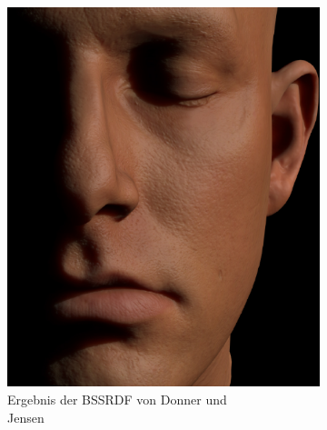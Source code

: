 \documentclass[ngerman,runningheads,a4paper]{llncs}[2018/03/10]
\begin{document}
\begin{figure}
  \centering
  \begin{subfigure}{.5\textwidth}
    \centering
    \includegraphics[scale=0.35,keepaspectratio]{./images/jensen-final-result.png}
    \caption{Ergebnis der BSSRDF von Donner und \\\hspace{\textwidth}Jensen\cite{spectral-bssrdf-human-skin}}
    \label{fig:outlook-bssrdf}
  \end{subfigure}%
  \begin{subfigure}{.5\textwidth}
    \centering

\end{subfigure}
\end{figure}
\end{document}
